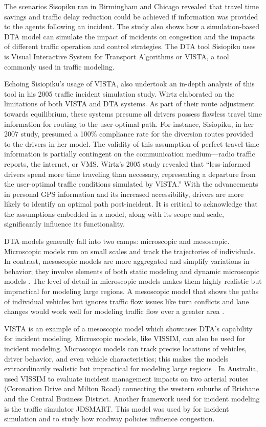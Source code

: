 \documentclass[
  letterpaper,
  authoryear]{elsarticle}
\begin{document}
The scenarios Sisopiku ran in Birmingham and Chicago revealed that
travel time savings and traffic delay reduction could be achieved if
information was provided to the agents following an incident. The study
also shows how a simulation-based DTA model can simulate the impact of
incidents on congestion and the impacts of different traffic operation
and control strategies. The DTA tool Sisiopiku uses is Visual
Interactive System for Transport Algorithms or VISTA, a tool commonly
used in traffic modeling.

Echoing Sisiopiku's usage of VISTA, \citet{wirtz2005} also undertook an
in-depth analysis of this tool in his 2005 traffic incident simulation
study. Wirtz elaborated on the limitations of both VISTA and DTA
systems. As part of their route adjustment towards equilibrium, these
systems presume all drivers possess flawless travel time information for
routing to the user-optimal path. For instance, Sisiopiku, in her 2007
study, presumed a 100\% compliance rate for the diversion routes
provided to the drivers in her model. The validity of this assumption of
perfect travel time information is partially contingent on the
communication medium---radio traffic reports, the internet, or VMS.
Wirtz's 2005 study revealed that ``less-informed drivers spend more time
traveling than necessary, representing a departure from the user-optimal
traffic conditions simulated by VISTA.'' With the advancements in
personal GPS information and its increased accessibility, drivers are
more likely to identify an optimal path post-incident. It is critical to
acknowledge that the assumptions embedded in a model, along with its
scope and scale, significantly influence its functionality.

DTA models generally fall into two camps: microscopic and mesoscopic.
Microscopic models run on small scales and track the trajectories of
individuals. In contrast, mesoscopic models are more aggregated and
simplify variations in behavior; they involve elements of both static
modeling and dynamic microscopic models \citep{boyles2018}. The level of
detail in microscopic models makes them highly realistic but impractical
for modeling large regions. A mesoscopic model that shows the paths of
individual vehicles but ignores traffic flow issues like turn conflicts
and lane changes would work well for modeling traffic flow over a
greater area \citep{boyles2018}.

VISTA is an example of a mesoscopic model which showcases DTA's
capability for incident modeling. Microscopic models, like VISSIM, can
also be used for incident modeling. Microscopic models can track precise
locations of vehicles, driver behavior, and even vehicle
characteristics; this makes the models extraordinarily realistic but
impractical for modeling large regions \citep{boyles2018}. In Australia,
\citet{dia2006} used VISSIM to evaluate incident management impacts on
two arterial routes (Coronation Drive and Milton Road) connecting the
western suburbs of Brisbane and the Central Business District. Another
framework used for incident modeling is the traffic simulator JDSMART.
This model was used by \citet{vanlint2012} for incident simulation and
to study how roadway policies influence congestion.
\end{document}
